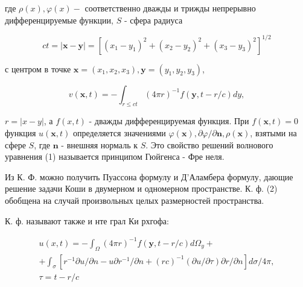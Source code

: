 \documentclass[10pt]{article}
\begin{document}
где $\rho(x), \varphi(x)-$ соответственно дважды и трижды непрерывно дифференцируемые функции, $S$ - сфера радиуса



\[

c t=|\boldsymbol{x}-\boldsymbol{y}|=\left[\left(x_{1}-y_{1}\right)^{2}+\left(x_{2}-y_{2}\right)^{2}+\left(x_{3}-y_{3}\right)^{2}\right]^{1 / 2}

\]



с центром в точке $\boldsymbol{x}=\left(x_{1}, x_{2}, x_{3}\right), \boldsymbol{y}=\left(y_{1}, y_{2}, y_{3}\right)$,



\[

v(\boldsymbol{x}, t)=-\int_{r \leqslant c t}(4 \pi r)^{-1} f(\boldsymbol{y}, t-r / c) d y,

\]



$r=|x-y|$, а $f(x, t)$ - дважды дифференцируемая функция. При $f(\boldsymbol{x}, t)=0$ функция $u(\boldsymbol{x}, t)$ определяется значениями $\varphi(\boldsymbol{x}), \partial \varphi / \partial \boldsymbol{n}, \rho(\boldsymbol{x})$, взятыми на сфере $S$, где $\boldsymbol{n}$ - внешняя нормаль к $S$. Это свойство решений волнового уравнения (1) называется принципом Гюйгенса - Фре неля.



Из К. Ф. можно получить Пуассона формулу и Д'Аламбера формулу, дающие решение задачи Коши в двумерном и одномерном пространстве. К. ф. (2) обобщена на случай произвольных целых размерностей пространства.



К. ф. называют также и нте грал Ки рхгофа:



\[

\begin{gathered}

u(x, t)=-\int_{\Omega}(4 \pi r)^{-1} f(\boldsymbol{y}, t-r / c) d \Omega_{y}+ \\

+\int_{\sigma}\left[r^{-1} \partial u / \partial n-u \partial r^{-1} / \partial n+(r c)^{-1}(\partial u / \partial \tau) \partial r / \partial n\right] d \sigma / 4 \pi, \\

\tau=t-r / c

\end{gathered}

\]
\end{document}
